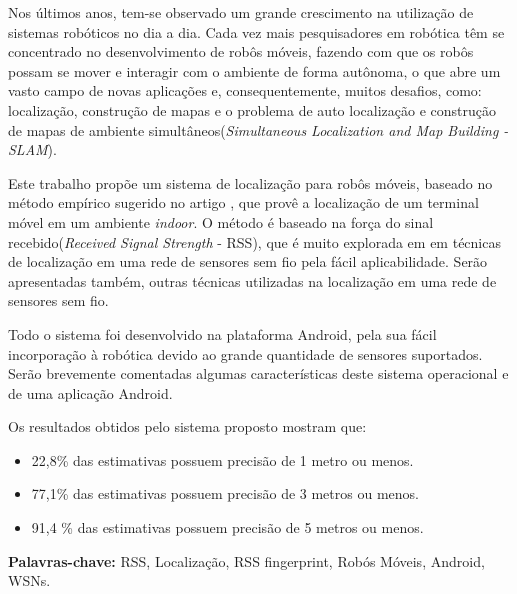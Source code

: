 	Nos últimos anos, tem-se observado um grande crescimento na utilização de sistemas robóticos no dia a dia.
	Cada vez mais pesquisadores em robótica têm se concentrado no desenvolvimento de robôs móveis, fazendo com que os
	 robôs possam se mover e interagir com o ambiente de forma autônoma, 
	o que abre um vasto campo de novas aplicações e, consequentemente, muitos desafios, como:  localização, construção de mapas e o problema
	de auto localização e construção 
  de mapas de ambiente simultâneos(\textit{Simultaneous Localization and Map Building - SLAM}). 
		
    Este trabalho propõe um sistema de localização para robôs móveis, 
    baseado no método empírico sugerido no artigo \cite{wifiRadar},
    que provê a localização de um terminal móvel em um ambiente \textit{indoor}. 
    O método é baseado na força do 
    sinal recebido(\textit{Received Signal Strength} - RSS), que é muito explorada em
    em técnicas de localização em uma rede de sensores sem fio pela fácil aplicabilidade. Serão apresentadas também, outras 
    técnicas utilizadas na localização em uma rede de sensores sem fio.
  
	Todo o sistema foi desenvolvido na plataforma Android, pela sua fácil incorporação à robótica devido ao 
	grande quantidade de sensores suportados. Serão brevemente comentadas
	algumas características deste sistema operacional e de uma aplicação Android.
   
   Os resultados obtidos pelo sistema proposto mostram que:
      \begin{itemize}
      \item 22,8\% das estimativas possuem precisão de 1 metro ou menos.
      \item 77,1\% das estimativas possuem precisão de 3 metros ou menos.
      \item 91,4 \% das estimativas possuem precisão de 5 metros ou menos.
     \end{itemize}
	
\textbf{Palavras-chave:} RSS, Localização, RSS fingerprint, Robós Móveis, Android, WSNs.